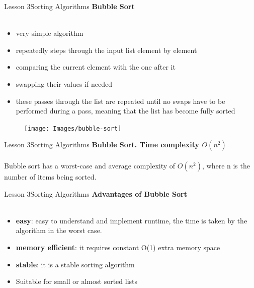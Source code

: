 \documentclass[aspectratio=1610]{beamer}
\begin{document}

\begin{frame}{Lesson 3}{Sorting Algorithms}
\LARGE
\textbf{Bubble Sort}\\~\\
\begin{minipage}{0.65\textwidth}
\Large
\begin{itemize}
    \item very simple algorithm
    \item repeatedly steps through the input list element by element
    \item comparing the current element with the one after it
    \item swapping their values if needed
    \item these passes through the list are repeated until no swaps have to be performed during a pass, meaning that the list has become fully sorted
\end{itemize}
  \end{minipage}
\begin{minipage}{.0\textwidth}
      \begin{figure}
        \texttt{[image: Images/bubble-sort]}
      \end{figure}
  \end{minipage}  
\end{frame}

\begin{frame}{Lesson 3}{Sorting Algorithms}
\LARGE
\textbf{Bubble Sort. Time complexity $O(n^2)$}\\~\\
Bubble sort has a worst-case and average complexity of $O(n^2)$, where 
n is the number of items being sorted.
\end{frame}


\begin{frame}{Lesson 3}{Sorting Algorithms}
\LARGE
\textbf{Advantages of Bubble Sort}\\~\\
\Large
\begin{itemize}
	\item \textbf{easy}: easy to understand and implement
 runtime, the time is taken by the algorithm in the worst case.
	\item \textbf{memory efficient}: it requires constant O(1) extra memory space
	\item \textbf{stable}: it is a stable sorting algorithm
	\item Suitable for small or almost sorted lists
\end{itemize}
\end{frame}
\end{document}

